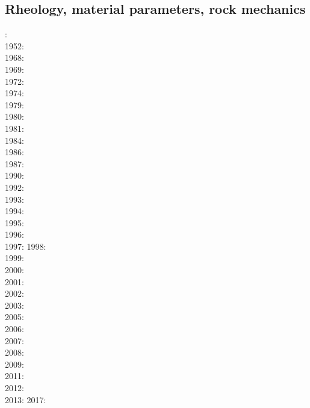 \subsection*{Rheology, material parameters, rock mechanics}

: \cite{druc51}\cite{hafn51}\\
1952: \cite{drpr52}\\
1968: \cite{byer68}\\
1969: \cite{hand69}\\
1972: \cite{carr72}\\
1974: \cite{kogo74}\\
1979: \cite{goev79}\cite{evgo79}\\
1980: \cite{brko80}\\
1981: \cite{delo81}\\
1984: \cite{rafi84}\cite{chpa84}\cite{vede84}\\
1986: \cite{kapf86}\\
1987: \cite{kikr87}\\
1990: \cite{wica90}\\
1992: \cite{bako92}\cite{chbo92}\cite{kali92}\cite{kohl92}\\
1993: \cite{kawu93}\\
1994: \cite{fran94}\\
1995: \cite{koem95}\cite{gltu95}\\
1996: \cite{wasd96}\cite{hiko96}\\
1997: \cite{eshe97a,eshe97b}
1998: \cite{copo98}\cite{mazk98}\\
1999: \cite{kayk99}\\
2000: \cite{rydr00}\cite{rana00}\cite{meko00a,meko00b}\\
2001: \cite{lova01}\\
2002: \cite{hirt02}\\
2003: \cite{hiko03}\cite{kaju03}\cite{mohi03}\\
2005: \cite{didr05}\cite{drur05}\\
2006: \cite{rygw06}\cite{buwa06}\\
2007: \cite{hirw07}\cite{kohl07}\cite{faja07}\\
2008: \cite{lemm08}\cite{budr08}\cite{koka08}\cite{gird08}\\
2009: \cite{kayk09}\cite{kako09}\\
2011: \cite{lell11}\cite{kemk11}\\
2012: \cite{reyn12}\\
2013: \cite{lepo13}\cite{miam13}
2017: \cite{bocc17}

